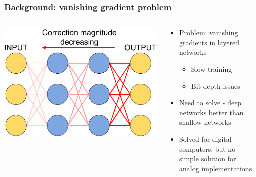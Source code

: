 \documentclass[pdf]{beamer}
\begin{document}
\begin{frame}
\frametitle{Background: vanishing gradient problem}
\begin{columns}
	\begin{column}{.5\textwidth}
		\includegraphics[width=\textwidth]{figures/vgp_illustration.pdf}
	\end{column}
	\begin{column}{.5\textwidth}
		\begin{itemize}
			\item<1-> Problem: vanishing gradients in layered networks
			\vspace{-4mm}\begin{itemize}
				\item<2-> Slow training
				\item<3-> Bit-depth issues
			\end{itemize}
			\item<4-> Need to solve - deep networks better than shallow networks
			\item<5-> Solved for digital computers, but no simple solution for analog implementations
		\end{itemize}
	\end{column}
\end{columns}
\end{frame}
\end{document}
